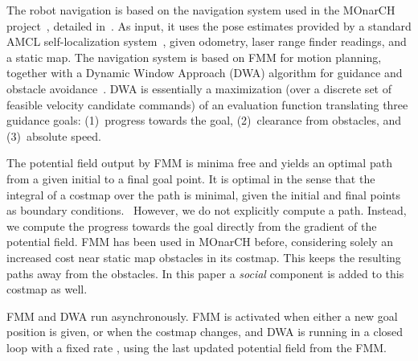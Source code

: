 The robot navigation is based on the navigation system used in the MOnarCH project~\cite{monarch2013}, detailed in~\cite{ventura2015}. As input, it uses the pose estimates provided by a standard AMCL self-localization system~\cite{amcl}, given odometry, laser range finder readings, and a static map. The navigation system is based on FMM for motion planning, together with a Dynamic Window Approach (DWA) algorithm for guidance and obstacle avoidance~\cite{fox1997dynamic}. DWA is essentially a maximization (over a discrete set of feasible velocity candidate commands) of an evaluation function translating three guidance goals: (1)~progress towards the goal, (2)~clearance from obstacles, and (3)~absolute speed.

The potential field output by FMM is minima free and yields an optimal path from a given initial to a final goal point. It is optimal in the sense that the integral of a costmap over the path is minimal, given the initial and final points as boundary conditions.
~However, we do not explicitly compute a path. Instead, we compute the progress towards the goal directly from the gradient of the potential field. FMM has been used in MOnarCH before, considering solely an increased cost near static map obstacles in its costmap. This keeps the resulting paths away from the obstacles. In this paper a \emph{social} component is added to this costmap as well.%

FMM and DWA run asynchronously. FMM is activated when either a new goal position is given, or when the costmap changes, and DWA is running in a closed loop with a fixed rate%
, using the last updated potential field from the FMM.


